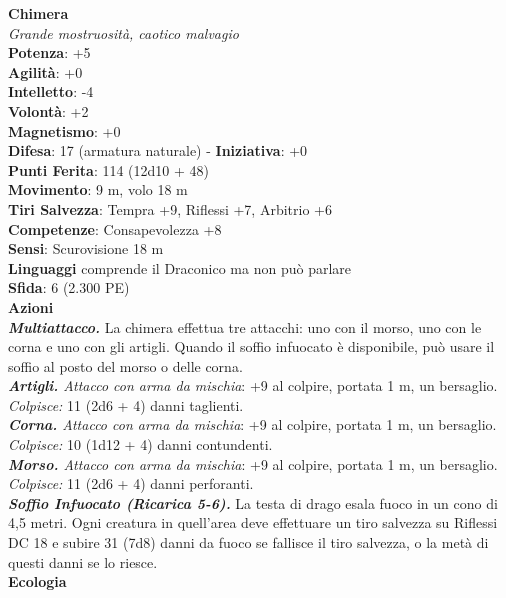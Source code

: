 \begin{multicols}{2}
\medskip\textbf{Chimera}\\
\emph{Grande mostruosità, caotico malvagio}\\
\textbf{Potenza}: +5\\
\textbf{Agilità}: +0\\
\textbf{Intelletto}: -4\\
\textbf{Volontà}: +2\\
\textbf{Magnetismo}: +0\\
\textbf{Difesa}: 17 (armatura naturale) - \textbf{Iniziativa}: +0\\
\textbf{Punti Ferita}: 114 (12d10 + 48)\\
\textbf{Movimento}: 9 m, volo 18 m\\
\textbf{Tiri Salvezza}: Tempra +9, Riflessi +7, Arbitrio +6\\
\textbf{Competenze}: Consapevolezza +8\\
\textbf{Sensi}: Scurovisione 18 m\\
\textbf{Linguaggi} comprende il Draconico ma non può parlare\\
\textbf{Sfida}: 6 (2.300 PE)\smallskip\\
\smallskip\textbf{Azioni}\\
\emph{\textbf{Multiattacco.}} La chimera effettua tre attacchi: uno con il morso, uno con le corna e uno con gli artigli. Quando il soffio infuocato è disponibile, può usare il soffio al posto del morso o delle corna.\\
\emph{\textbf{Artigli.} Attacco con arma da mischia}: +9 al colpire, portata 1 m, un bersaglio. \\
\emph{Colpisce:} 11 (2d6 + 4) danni taglienti.\\
\emph{\textbf{Corna.} Attacco con arma da mischia}: +9 al colpire, portata 1 m, un bersaglio.\\
\emph{Colpisce:} 10 (1d12 + 4) danni contundenti.\\
\emph{\textbf{Morso.} Attacco con arma da mischia}: +9 al colpire, portata 1 m, un bersaglio.\\
\emph{Colpisce:} 11 (2d6 + 4) danni perforanti.\\
\emph{\textbf{Soffio Infuocato (Ricarica 5-6).}} La testa di drago esala fuoco in un cono di 4,5 metri. Ogni creatura in quell'area deve effettuare un tiro salvezza su Riflessi DC  18 e subire 31 (7d8) danni da fuoco se fallisce il tiro salvezza, o la metà di questi danni se lo riesce.\\
\textbf{Ecologia}\\

\end{multicols}

